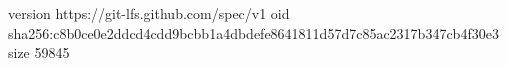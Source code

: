 version https://git-lfs.github.com/spec/v1
oid sha256:c8b0ce0e2ddcd4cdd9bcbb1a4dbdefe8641811d57d7c85ac2317b347cb4f30e3
size 59845
